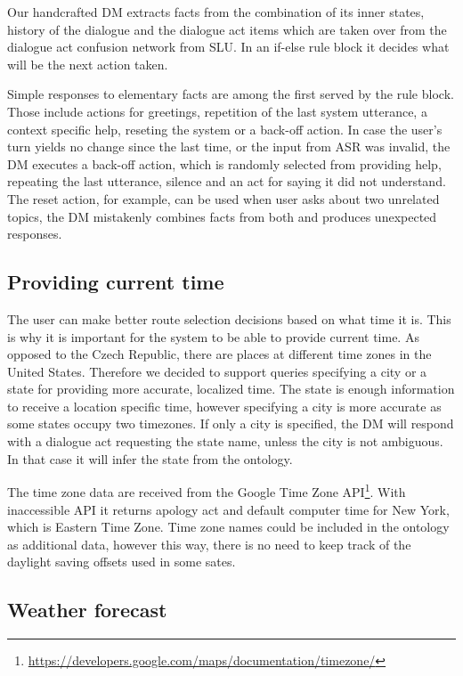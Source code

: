 Our handcrafted DM extracts facts from the combination of its inner states, history of the dialogue and the dialogue act items which are taken over from the dialogue act confusion network from SLU.
In an if-else rule block it decides what will be the next action taken.

Simple responses to elementary facts are among the first served by the rule block.
Those include actions for greetings, repetition of the last system utterance, a context specific help, reseting the system or a back-off action.
In case the user's turn yields no change since the last time, or the input from ASR was invalid, the DM executes a back-off action, which is randomly selected from providing help, repeating the last utterance, silence and an act for saying it did not understand.
The reset action, for example, can be used when user asks about two unrelated topics, the DM mistakenly combines facts from both and 
produces unexpected responses.

\subsection{Providing current time} \label{subsec:time}

The user can make better route selection decisions based on what time it is.
This is why it is important for the system to be able to provide current time.
As opposed to the Czech Republic, there are places at different time zones in the United States.
Therefore we decided to support queries specifying a city or a state for providing more accurate, localized time.
The state is enough information to receive a location specific time, however specifying a city is more accurate as some states occupy two timezones.
If only a city is specified, the DM will respond with a dialogue act requesting the state name, unless the city is not ambiguous.
In that case it will infer the state from the ontology.

The time zone data are received from the Google Time Zone API\footnote{\url{https://developers.google.com/maps/documentation/timezone/}}. With inaccessible API it returns apology act and default computer time for New York, which is Eastern Time Zone.
Time zone names could be included in the ontology as additional data, however this way, there is no need to keep track of the daylight saving offsets used in some sates.

\subsection{Weather forecast}


